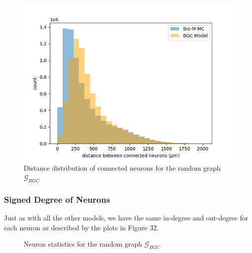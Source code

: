 \begin{figure}[H]
\begin{center}
\captionsetup{justification=centering}
\includegraphics[width=12cm]{GBC/Block_dist_distr.png}
\caption{Distance distribution of connected neurons for the random graph $\mathcal{G}_{BGC}$}
\end{center}
\end{figure}

\subsubsection{Signed Degree of Neurons}
Just as with all the other models, we have the same in-degree and out-degree for each neuron as described by the plots in Figure 32. 

\begin{figure}[H]%
    \centering
    \captionsetup{justification=centering}
    \qquad
    \caption{Neuron statistics for the random graph $\mathcal{G}_{BGC}$}%
    \label{fig:example}%
\end{figure}



